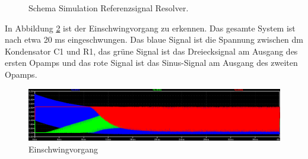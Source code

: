 \begin{figure}[h!]
\centering
{}
\hfill
{}
\hfill
\caption{Schema Simulation Referenzsignal Resolver.}
\label{fig:Simulation_Referenzsignal0}
\end{figure}

\newpage
In Abbildung \ref{fig:Simulation_Einschwingvorgang} ist der Einschwingvorgang zu erkennen. Das gesamte System ist nach etwa 20 ms eingeschwungen. Das blaue Signal ist die Spannung zwischen dm Kondensator C1 und R1, das grüne Signal ist das Dreiecksignal am Ausgang des ersten Opamps und das rote Signal ist das Sinus-Signal am Ausgang des zweiten Opamps.

\begin{figure}[h!]
	\centering
	\includegraphics[width=\textwidth]{graphics/Einschwingvorgang.png}
	\caption{Einschwingvorgang}
	\label{fig:Simulation_Einschwingvorgang}
\end{figure}


